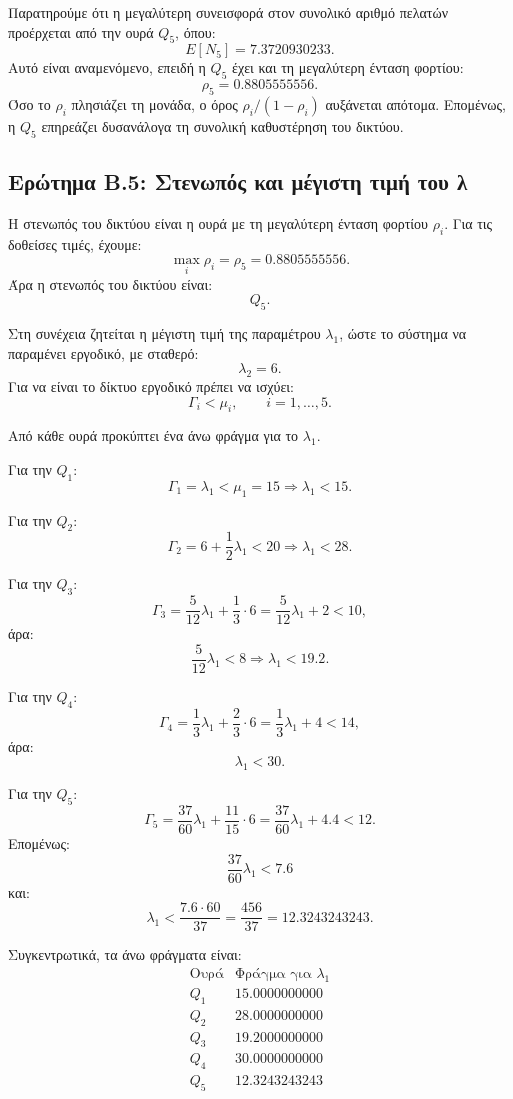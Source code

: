 \documentclass{article}
\begin{document}
Παρατηρούμε ότι η μεγαλύτερη συνεισφορά στον συνολικό αριθμό πελατών προέρχεται από την ουρά $Q_5$, όπου:
\[
    E[N_5] = 7.3720930233.
\]
Αυτό είναι αναμενόμενο, επειδή η $Q_5$ έχει και τη μεγαλύτερη ένταση φορτίου:
\[
    \rho_5 = 0.8805555556.
\]
Όσο το $\rho_i$ πλησιάζει τη μονάδα, ο όρος $\rho_i/(1-\rho_i)$ αυξάνεται απότομα. Επομένως, η $Q_5$ επηρεάζει δυσανάλογα τη συνολική καθυστέρηση του δικτύου.

\subsection{Ερώτημα Β.5: Στενωπός και μέγιστη τιμή του λ}

Η στενωπός του δικτύου είναι η ουρά με τη μεγαλύτερη ένταση φορτίου $\rho_i$. Για τις δοθείσες τιμές, έχουμε:
\[
    \max_i \rho_i = \rho_5 = 0.8805555556.
\]
Άρα η στενωπός του δικτύου είναι:
\[
    Q_5.
\]

Στη συνέχεια ζητείται η μέγιστη τιμή της παραμέτρου $\lambda_1$, ώστε το σύστημα να παραμένει εργοδικό, με σταθερό:
\[
    \lambda_2 = 6.
\]
Για να είναι το δίκτυο εργοδικό πρέπει να ισχύει:
\[
    \Gamma_i < \mu_i,
    \qquad i=1,\ldots,5.
\]

Από κάθε ουρά προκύπτει ένα άνω φράγμα για το $\lambda_1$.

Για την $Q_1$:
\[
    \Gamma_1 = \lambda_1 < \mu_1 = 15
    \Rightarrow
    \lambda_1 < 15.
\]

Για την $Q_2$:
\[
    \Gamma_2 = 6 + \frac{1}{2}\lambda_1 < 20
    \Rightarrow
    \lambda_1 < 28.
\]

Για την $Q_3$:
\[
    \Gamma_3 =
    \frac{5}{12}\lambda_1+\frac{1}{3}\cdot 6
    =
    \frac{5}{12}\lambda_1+2
    <10,
\]
άρα:
\[
    \frac{5}{12}\lambda_1 < 8
    \Rightarrow
    \lambda_1 < 19.2.
\]

Για την $Q_4$:
\[
    \Gamma_4 =
    \frac{1}{3}\lambda_1+\frac{2}{3}\cdot 6
    =
    \frac{1}{3}\lambda_1+4
    <14,
\]
άρα:
\[
    \lambda_1 < 30.
\]

Για την $Q_5$:
\[
    \Gamma_5 =
    \frac{37}{60}\lambda_1+\frac{11}{15}\cdot 6
    =
    \frac{37}{60}\lambda_1+4.4
    <12.
\]
Επομένως:
\[
    \frac{37}{60}\lambda_1 < 7.6
\]
και:
\[
    \lambda_1 < \frac{7.6\cdot 60}{37}
    =
    \frac{456}{37}
    =
    12.3243243243.
\]

Συγκεντρωτικά, τα άνω φράγματα είναι:
\[
\begin{array}{c|c}
\text{Ουρά} & \text{Φράγμα για } \lambda_1 \\
\hline
Q_1 & 15.0000000000 \\
Q_2 & 28.0000000000 \\
Q_3 & 19.2000000000 \\
Q_4 & 30.0000000000 \\
Q_5 & 12.3243243243
\end{array}
\]
\end{document}
